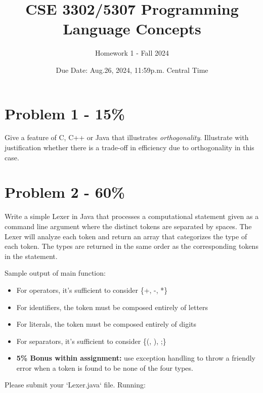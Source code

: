 \documentclass{article}
\begin{document}
\title{CSE 3302/5307 Programming Language Concepts}
\author{Homework 1 - Fall 2024}
\date{Due Date: Aug.26, 2024, 11:59p.m. Central Time}
\maketitle
\thispagestyle{fancy}
\section*{Problem 1 - 15\%}
{ Give a feature of C, C++ or Java that illustrates \textit{orthogonality}. Illustrate with justification whether there is a trade-off in efficiency due to orthogonality in this case.}


\section*{Problem 2 - 60\%}
Write a simple Lexer in Java that processes a computational statement given as a command line argument where the distinct tokens are separated by spaces. The Lexer will analyze each token and return an array that categorizes the type of each token. The types are returned in the same order as the corresponding tokens in the statement.
	
Sample output of main function:


\begin{itemize}
    \item For operators, it's sufficient to consider \{+, -, *\}
    \item For identifiers, the token must be composed entirely of letters
    \item For literals, the token must be composed entirely of digits
    \item For separators, it's sufficient to consider \{(, ), ;\}
    \item \textbf{5\% Bonus within assignment:} use exception handling to throw a friendly error when a token is found to be none of the four types.

\end{itemize}
Please submit your `Lexer.java` file. Running:
\end{document}
